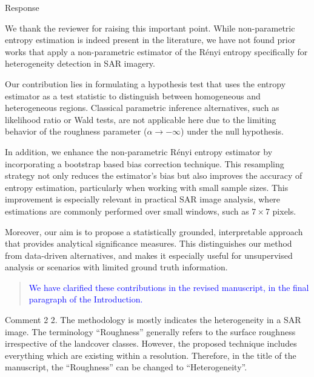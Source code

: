 \documentclass[11pt]{report}
\begin{document}
\begin{responsebox}{Response}


We thank the reviewer for raising this important point. While non-parametric entropy estimation is indeed present in the literature, we have not found prior works that apply a non-parametric estimator of the Rényi entropy specifically for heterogeneity detection in SAR imagery.

Our contribution lies in formulating a hypothesis test that uses the entropy estimator as a test statistic to distinguish between homogeneous and heterogeneous regions. Classical parametric inference alternatives, such as likelihood ratio or Wald tests, are not applicable here due to the limiting behavior of the roughness parameter (\(\alpha \to -\infty\)) under the null hypothesis.

In addition, we enhance the non-parametric Rényi entropy estimator by incorporating a bootstrap based bias correction technique. This resampling strategy not only reduces the estimator’s bias but also improves the accuracy of entropy estimation, particularly when working with small sample sizes. This improvement is especially relevant in practical SAR image analysis, where estimations are commonly performed over small windows, such as \(7 \times 7\) pixels.

Moreover, our aim is to propose a statistically grounded, interpretable approach that provides analytical significance measures. This distinguishes our method from data-driven alternatives, and makes it especially useful for unsupervised analysis or scenarios with limited ground truth information.



\begin{quote}
	\textcolor{blue}{ We have clarified these contributions in the revised manuscript, in the final paragraph of the Introduction.}
\end{quote}

\end{responsebox}

\vspace{1em}
\begin{reviewbox}{Comment 2}
2. The methodology is mostly indicates the heterogeneity in a SAR image. The terminology ``Roughness'' generally refers to the surface roughness irrespective of the landcover classes. However, the proposed technique includes everything which are existing within a resolution. Therefore, in the title of the manuscript, the ``Roughness'' can be changed to ``Heterogeneity''.
\end{reviewbox}
\end{document}
